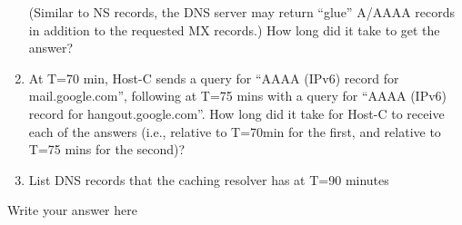 \documentclass{report}
\begin{document}
\begin{problem}
\begin{enumerate}
\begin{lstlisting}
\end{lstlisting}

(Similar to NS records, the DNS server may return “glue” A/AAAA records in addition to the requested MX records.)
How long did it take to get the answer?


\item At T=70 min, Host-C sends a query for “AAAA (IPv6) record for mail.google.com”, following at T=75 mins with a query for “AAAA (IPv6) record for hangout.google.com”. How long did it take for Host-C to receive each of the answers (i.e., relative to T=70min for the first, and relative to T=75 mins for the second)?

\item List DNS records that the caching resolver has at T=90 minutes





\end{enumerate}

\begin{answer}{24em}
    Write your answer here

\end{answer}

\end{problem}
\end{document}
